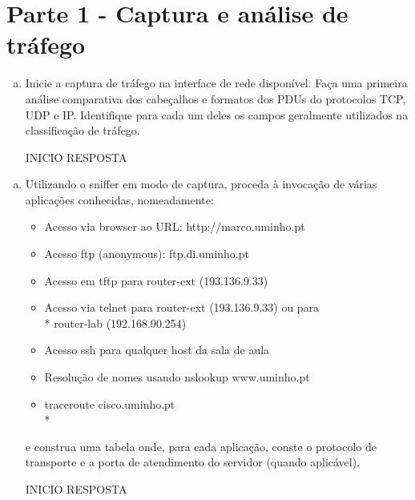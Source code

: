 \documentclass{llncs}
\begin{document}
%
\section{Parte 1 - Captura e análise de tráfego}


\begin{enumerate}[a)]
  \item Inicie a captura de tráfego na interface de rede disponível. Faça uma primeira análise comparativa dos
  cabeçalhos e formatos dos PDUs do protocolos TCP, UDP e IP. Identifique para cada um deles os campos
  geralmente utilizados na classificação de tráfego.
  \begin{flushleft}
    INICIO RESPOSTA
  \end{flushleft}
\end{enumerate}

\begin{enumerate}[b)]
  \item Utilizando o sniffer em modo de captura, proceda à invocação de várias aplicações conhecidas, nomeadamente:
  \begin{itemize}
      \item Acesso via browser ao URL: http://marco.uminho.pt
      \item Acesso ftp (anonymous): ftp.di.uminho.pt
      \item Acesso em tftp para router-ext (193.136.9.33)
      \item Acesso via telnet para router-ext (193.136.9.33) ou para\\*
      router-lab (192.168.90.254)
      \item Acesso ssh para qualquer host da sala de aula
      \item Resolução de nomes usando nslookup www.uminho.pt
      \item traceroute cisco.uminho.pt\\*
  \end{itemize}
  \par e construa uma tabela onde, para cada aplicação, conste o protocolo de transporte e a porta de atendimento do
  servidor (quando aplicável).
  
  \begin{flushleft}
    INICIO RESPOSTA
  \end{flushleft}
\end{enumerate}
\end{document}

